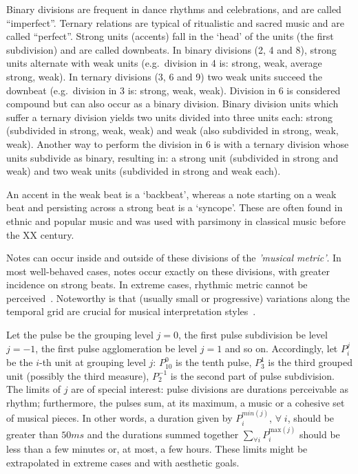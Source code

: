 \documentclass[format=acmsmall, review=false, screen=true]{acmart}
\begin{document}
Binary divisions are frequent in dance rhythms and celebrations, and are called ``imperfect''.
Ternary relations are typical of
ritualistic and sacred music and are called ``perfect''.
Strong units (accents) fall in the `head' of the units (the first subdivision) and are called downbeats. In binary divisions (2, 4
and 8), strong units alternate with weak units
(e.g.\ division in 4 is: strong, weak, average strong, weak). In ternary divisions
(3, 6 and 9) two weak units succeed the downbeat (e.g.\ division in 3 is:
strong, weak, weak). Division in 6 is considered compound but can also
occur as a binary division. Binary division units which suffer a ternary division yields two units divided into three units each: strong (subdivided in strong,
weak, weak) and weak (also subdivided in strong, weak, weak). Another way to perform
the division in 6 is with a ternary division whose units subdivide as binary,
resulting in: a strong unit (subdivided in strong and weak) and two weak units
(subdivided in strong and weak each).

An accent in the weak beat is a `backbeat', whereas a note starting on a weak beat and persisting across a strong beat is a `syncope'.
These are often found in ethnic and popular music and was used with parsimony in classical music before the XX century.

Notes can occur inside and outside of these divisions of the \emph{'musical metric'}. In most well-behaved cases, notes occur exactly on these divisions, with greater incidence on strong beats.
In extreme cases, rhythmic metric cannot be perceived~\cite{Roederer}. 
Noteworthy is that (usually small or progressive) variations along the temporal grid are crucial for musical interpretation
styles~\cite{Cook}.

Let the pulse be the grouping level $j=0$, the first pulse subdivision be level $j=-1$,
the first pulse agglomeration be level $j=1$ and so on. Accordingly, let $P_i^j$ be the $i$-th unit at grouping level $j$: $P^0_{10}$ is the tenth pulse, $P^{1}_3$ is the third grouped unit (possibly the third measure),
$P^{-1}_2$ is the second part of pulse subdivision. The limits of $j$ are of special interest: pulse divisions are durations perceivable as rhythm; furthermore, the pulses sum, at its maximum, a music or a cohesive set of musical pieces. In other words, a duration given
by $P^{min(j)}_i$, $\forall \; i$, should be greater than $50 ms$ and the durations
summed together $\sum_{\forall i}P^{\text{max}(j)}_i$ should be less than a few
minutes or, at most, a few hours.
These limits might be extrapolated in extreme cases and with aesthetic goals.
\end{document}
